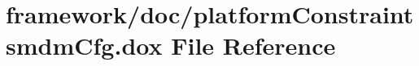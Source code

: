 \hypertarget{platform_constraintsmdm_cfg_8dox}{}\section{framework/doc/platform\+Constraintsmdm\+Cfg.dox File Reference}
\label{platform_constraintsmdm_cfg_8dox}
